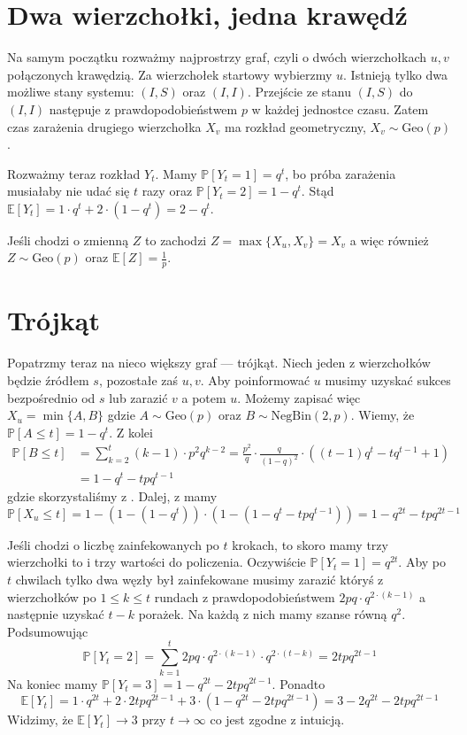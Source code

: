 \section{Dwa wierzchołki, jedna krawędź}

Na samym początku rozważmy najprostrzy graf, czyli o dwóch wierzchołkach $u,v$ połączonych krawędzią. Za wierzchołek startowy wybierzmy $u$. Istnieją tylko dwa możliwe stany systemu: $(I,S)$ oraz $(I,I)$. Przejście ze stanu $(I, S)$ do $(I, I)$ następuje z prawdopodobieństwem $p$ w każdej jednostce czasu. Zatem czas zarażenia drugiego wierzchołka $X_v$ ma rozkład geometryczny, $X_v \sim \mathrm{Geo}(p)$. 

Rozważmy teraz rozkład $Y_t$. Mamy $\mathbb{P}[Y_t=1]=q^t$, bo próba zarażenia musiałaby nie udać się $t$ razy oraz $\mathbb{P}[Y_t=2]=1-q^t$. Stąd $\mathbb{E}[Y_t]=1\cdot q^t + 2 \cdot (1-q^t) = 2-q^t$. 

Jeśli chodzi o zmienną $Z$ to zachodzi $Z=\max\{X_u,X_v\}=X_v$ a więc również $Z\sim \mathrm{Geo}(p)$ oraz $\mathbb{E}[Z]=\frac{1}{p}$.


\section{Trójkąt}


Popatrzmy teraz na nieco większy graf — trójkąt. Niech jeden z wierzchołków będzie źródłem $s$, pozostałe zaś $u,v$. Aby poinformować $u$ musimy uzyskać sukces bezpośrednio od $s$ lub zarazić $v$ a potem $u$. Możemy zapisać więc $X_u = \min\{A,B\}$ gdzie $A\sim \mathrm{Geo}(p)$ oraz $B\sim \mathrm{NegBin}(2,p)$. Wiemy, że $\mathbb{P}[A\le t] =1-q^t$. Z kolei 
\begin{equation*}
\begin{aligned}
\mathbb{P}[B\le t]
&= \sum_{k=2}^{t} (k-1)\cdot p^2q^{k-2}= \frac{p^2}{q}\cdot \frac{q}{{(1-q)}^2}\cdot((t-1)q^t-tq^{t-1}+1) \\
&=1-q^t-tpq^{t-1}
\end{aligned}
\end{equation*}
gdzie skorzystaliśmy z . Dalej, z  mamy
\[
    \mathbb{P}[X_u\le t] = 1 - (1-(1-q^t))\cdot (1-(1-q^t-tpq^{t-1})) = 1-q^{2t}-tpq^{2t-1}
\]

Jeśli chodzi o liczbę zainfekowanych po $t$ krokach, to skoro mamy trzy wierzchołki to i trzy wartości do policzenia. Oczywiście $\mathbb{P}[Y_t=1]=q^{2t}$. Aby po $t$ chwilach tylko dwa węzły był zainfekowane musimy zarazić któryś z wierzchołków po $1\le k\le t$ rundach z prawdopodobieństwem $2pq\cdot q^{2\cdot(k-1)}$ a następnie uzyskać $t-k$ porażek. Na każdą z nich mamy szanse równą $q^2$. Podsumowując 
\[
    \mathbb{P}[Y_t=2]=\sum_{k=1}^{t} 2pq\cdot q^{2\cdot(k-1)} \cdot q^{2\cdot(t-k)} = 2tpq^{2t-1}
\]
Na koniec mamy $\mathbb{P}[Y_t=3]=1-q^{2t}-2tpq^{2t-1}$. Ponadto
\[
    \mathbb{E}[Y_t] = 1 \cdot q^{2t} + 2 \cdot 2tpq^{2t-1} + 3\cdot (1-q^{2t}-2tpq^{2t-1}) = 3-2q^{2t}-2tpq^{2t-1}
\]
Widzimy, że $\mathbb{E}[Y_t] \to 3$ przy $t\to \infty$ co jest zgodne z intuicją.

